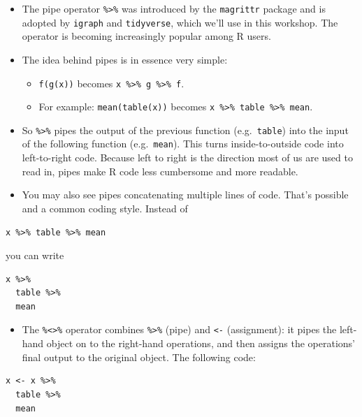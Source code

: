 \documentclass[
]{book}
\providecommand{\tightlist}{%
  \setlength{\itemsep}{0pt}\setlength{\parskip}{0pt}}
\begin{document}
\begin{itemize}
\tightlist
\item
  The pipe operator \texttt{\%\textgreater{}\%} was introduced by the \texttt{magrittr} package and is adopted by \texttt{igraph} and \texttt{tidyverse}, which we'll use in this workshop. The operator is becoming increasingly popular among R users.
\item
  The idea behind pipes is in essence very simple:

  \begin{itemize}
  \tightlist
  \item
    \texttt{f(g(x))} becomes \texttt{x\ \%\textgreater{}\%\ g\ \%\textgreater{}\%\ f}.
  \item
    For example: \texttt{mean(table(x))} becomes \texttt{x\ \%\textgreater{}\%\ table\ \%\textgreater{}\%\ mean}.
  \end{itemize}
\item
  So \texttt{\%\textgreater{}\%} pipes the output of the previous function (e.g.~\texttt{table}) into the input of the following function (e.g.~\texttt{mean}). This turns inside-to-outside code into left-to-right code. Because left to right is the direction most of us are used to read in, pipes make R code less cumbersome and more readable.
\item
  You may also see pipes concatenating multiple lines of code. That's possible and a common coding style. Instead of
\end{itemize}

\begin{verbatim}
x %>% table %>% mean
\end{verbatim}

you can write

\begin{verbatim}
x %>%
  table %>%
  mean
\end{verbatim}

\begin{itemize}
\tightlist
\item
  The \texttt{\%\textless{}\textgreater{}\%} operator combines \texttt{\%\textgreater{}\%} (pipe) and \texttt{\textless{}-} (assignment): it pipes the left-hand object on to the right-hand operations, and then assigns the operations' final output to the original object. The following code:
\end{itemize}

\begin{verbatim}
x <- x %>%
  table %>%
  mean
\end{verbatim}
\end{document}
